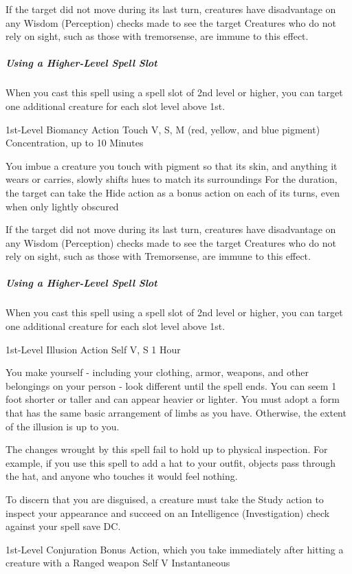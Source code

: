\documentclass[letterpaper,openany,oneside,twocolumn]{book}
\begin{document}
If the target did not move during its last turn, creatures have disadvantage on any Wisdom (Perception) checks made to see the target Creatures who do not rely on sight, such as those with tremorsense, are immune to this effect.

\subparagraph*{Using a Higher-Level Spell Slot} When you cast this spell using a spell slot of 2nd level or higher, you can target one additional creature for each slot level above 1st.

	{1st-Level Biomancy}
	{Action}
	{Touch}
	{V, S, M (red, yellow, and blue pigment)}
	{Concentration, up to 10 Minutes}

You imbue a creature you touch with pigment so that its skin, and anything it wears or carries, slowly shifts hues to match its surroundings For the duration, the target can take the Hide action as a bonus action on each of its turns, even when only lightly obscured

If the target did not move during its last turn, creatures have disadvantage on any Wisdom (Perception) checks made to see the target Creatures who do not rely on sight, such as those with Tremorsense, are immune to this effect.

\subparagraph*{Using a Higher-Level Spell Slot} When you cast this spell using a spell slot of 2nd level or higher, you can target one additional creature for each slot level above 1st.

	{1st-Level Illusion}
	{Action}
	{Self}
	{V, S}
	{1 Hour}

You make yourself - including your clothing, armor, weapons, and other belongings on your person - look different until the spell ends. You can seem 1 foot shorter or taller and can appear heavier or lighter. You must adopt a form that has the same basic arrangement of limbs as you have. Otherwise, the extent of the illusion is up to you.

The changes wrought by this spell fail to hold up to physical inspection. For example, if you use this spell to add a hat to your outfit, objects pass through the hat, and anyone who touches it would feel nothing.

To discern that you are disguised, a creature must take the Study action to inspect your appearance and succeed on an Intelligence (Investigation) check against your spell save DC.

	{1st-Level Conjuration}
	{Bonus Action, which you take immediately after hitting a creature with a Ranged weapon}
	{Self}
	{V}
	{Instantaneous}
\end{document}
